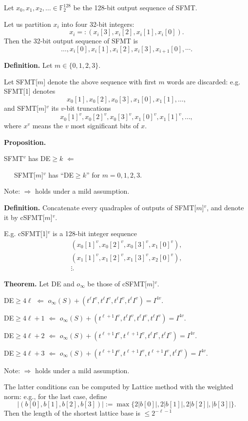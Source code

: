 \documentclass[a4j,12pt,landscape]{jarticle}
\def\F2{{\mathbb F}_2}
\begin{document}
\vskip 5mm
Let $x_0, x_1, x_2, \ldots \in \F2^{128}$ be the
128-bit output sequence of SFMT.

Let us partition $x_i$ into four 32-bit integers:
$$
x_i =: (x_i[3], x_i[2], x_i[1], x_i[0]).
$$
Then the 32-bit output sequence of SFMT is
$$
\ldots, x_i[0], x_i[1], x_i[2], x_i[3], x_{i+1}[0], \cdots.
$$

\newpage
{\bf Definition.}
Let $m \in \{0,1,2,3\}$.

Let SFMT[$m$] denote the above
sequence with first $m$ words are discarded:
e.g. SFMT[1] denotes
$$
x_0[1], x_0[2], x_0[3], x_1[0], x_1[1], \ldots,
$$
and SFMT[$m$]$^v$ its $v$-bit truncations
\def\MSB{{\mbox{MSB}}}
$$
x_0[1]^v, x_0[2]^v, x_0[3]^v, x_1[0]^v, x_1[1]^v, \ldots,
$$
where $x^v$ means the $v$ most significant bits of $x$.


\vskip 3mm
{\bf Proposition.}

SFMT$^v$ has DE$ \geq k$ 
$\Leftarrow$

~~~SFMT[$m$]$^v$ has ``DE$ \geq k$''
for $m=0,1,2,3$.

Note: $\Rightarrow$ holds under a mild assumption.

\newpage
{\bf Definition.}
Concatenate every quadraples of outputs
of SFMT[$m$]$^v$, and denote it by cSFMT[$m$]$^v$.

E.g. cSFMT[1]$^v$ is a 128-bit integer sequence
$$
\begin{array}{c}
(x_0[1]^v, x_0[2]^v, x_0[3]^v, x_1[0]^v), \\
(x_1[1]^v, x_1[2]^v, x_1[3]^v, x_2[0]^v), \\
 \vdots.
\end{array}
$$

\newpage 
{\bf Theorem.} Let DE and $o_\infty$ be those of cSFMT[$m$]$^v$.

DE$\geq 4\ell$
$\Leftarrow$
$
o_\infty(S) + (t^\ell I^v,  t^\ell I^v,  t^\ell I^v, t^\ell I^v)
=I^{4v}.
$

DE$\geq 4\ell+1$
$\Leftarrow$
$
o_\infty(S) + (t^{\ell+1} I^v,  t^\ell I^v,  t^\ell I^v, t^\ell I^v)
=I^{4v}.
$

DE$\geq 4\ell+2$
$\Leftarrow$
$
o_\infty(S) + (t^{\ell+1} I^v,  t^{\ell+1} I^v,  t^\ell I^v, t^\ell I^v)
=I^{4v}.
$

DE$\geq 4\ell+3$
$\Leftarrow$
$
o_\infty(S) + (t^{\ell+1} I^v,  t^{\ell+1} I^v,  t^{\ell+1} I^v, t^\ell I^v)
=I^{4v}.
$

Note: $\Rightarrow$ holds under a mild assumption.

\newpage
The latter conditions can be computed by Lattice method
with the weighted norm: e.g., for the last case, define
$$
|(b[0], b[1], b[2], b[3])| := \max \{2|b[0]|, 2|b[1]|, 2|b[2]|, |b[3]|\}.
$$
Then the length of the shortest lattice base is $\leq 2^{-\ell-1}$
\end{document}

